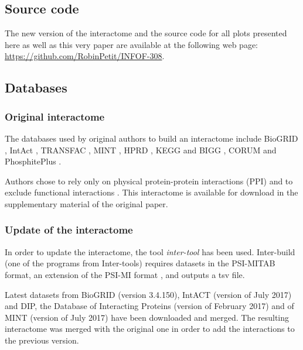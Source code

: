 \documentclass[letterpaper]{article}
\begin{document}
	\subsection{Source code}
	The new version of the interactome and the source code for all plots presented here as well as this
	very paper are available at the following web page: \url{https://github.com/RobinPetit/INFOF-308}.

	\subsection{Databases}
		\subsubsection{Original interactome}
		The databases used by original authors to build an interactome include BioGRID \citep{chatr2017biogrid},
		IntAct \citep{kerrien2011intact}, TRANSFAC \citep{matys2003transfac}, MINT \citep{licata2011mint}, HPRD
		\citep{keshava2008HPRD}, KEGG and BIGG \citep{lee2008KEGG-BIGG}, CORUM \citep{ruepp2009corum} and
		PhosphitePlus \citep{hornbeck2011phosphositeplus}.

		Authors chose to rely only on physical protein-protein interactions (PPI) and to exclude functional
		interactions \citep{caldera2017interactome}. This interactome is available for download in the
		supplementary material of the original paper.

		\subsubsection{Update of the interactome}
		In order to update the interactome, the tool \textit{inter-tool} \citep{inter-tools} has been used.
		Inter-build (one of the programs from Inter-tools) requires datasets in the PSI-MITAB format, an extension of the
		PSI-MI format \citep{MITABFormat}, and outputs a tsv file.


		Latest datasets from BioGRID (version 3.4.150), IntACT (version of July 2017) and DIP, the Database of
		Interacting Proteins (version of February 2017) \citep{salwinski2004DIP} and of MINT (version of July
		2017) have been downloaded and merged. The resulting interactome was merged with the original one in
		order to add the interactions to the previous version.
\end{document}
